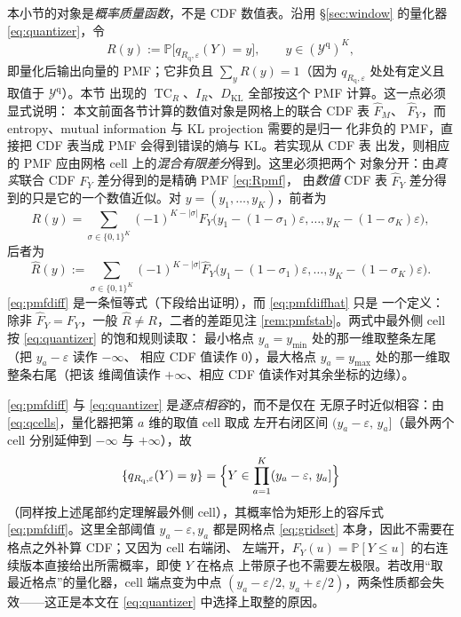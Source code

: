 \documentclass[a4paper,11pt]{article}
\theoremstyle{definition}
\newcommand{\Prob}{\mathbb P}
\newcommand{\1}{\mathbf 1}
\newcommand{\KL}{\mathrm{KL}}
\newcommand{\TC}{\operatorname{TC}}
\newcommand{\Rq}{R_{\mathrm{q}}}
\begin{document}
本小节的对象是\emph{概率质量函数}，不是 CDF 数值表。沿用 \S\ref{sec:window}
的量化器 \eqref{eq:quantizer}，令
\begin{equation}
\label{eq:Rpmf}
R(y):=\Prob\bigl[q_{\Rq,\varepsilon}(Y)=y\bigr],
\qquad
y\in(\mathcal Y^{\mathrm{q}})^{K},
\end{equation}
即量化后输出向量的 PMF；它非负且 $\sum_yR(y)=1$（因为
$q_{\Rq,\varepsilon}$ 处处有定义且取值于 $\mathcal Y^{\mathrm{q}}$）。本节
出现的 $\TC_R$、$I_R$、$D_{\KL}$ 全部按这个 PMF 计算。这一点必须显式说明：
本文前面各节计算的数值对象是网格上的联合 CDF 表 $\widehat F_M$、
$\widehat F_Y$，而 entropy、mutual information 与 KL projection 需要的是归一
化非负的 PMF，直接把 CDF 表当成 PMF 会得到错误的熵与 KL。若实现从 CDF 表
出发，则相应的 PMF 应由网格 cell 上的\emph{混合有限差分}得到。这里必须把两个
对象分开：由\emph{真实}联合 CDF $F_Y$ 差分得到的是精确 PMF \eqref{eq:Rpmf}，
由\emph{数值} CDF 表 $\widehat F_Y$ 差分得到的只是它的一个数值近似。对
$y=(y_1,\ldots,y_K)$，前者为
\begin{equation}
\label{eq:pmfdiff}
R(y)
=
\sum_{\sigma\in\{0,1\}^{K}}(-1)^{K-|\sigma|}
F_Y\bigl(y_1-(1-\sigma_1)\varepsilon,\ldots,
y_K-(1-\sigma_K)\varepsilon\bigr),
\end{equation}
后者为
\begin{equation}
\label{eq:pmfdiffhat}
\widehat R(y)
:=
\sum_{\sigma\in\{0,1\}^{K}}(-1)^{K-|\sigma|}
\widehat F_Y\bigl(y_1-(1-\sigma_1)\varepsilon,\ldots,
y_K-(1-\sigma_K)\varepsilon\bigr).
\end{equation}
\eqref{eq:pmfdiff} 是一条恒等式（下段给出证明），而 \eqref{eq:pmfdiffhat} 只是
一个定义：除非 $\widehat F_Y=F_Y$，一般 $\widehat R\ne R$，二者的差距见注
\ref{rem:pmfstab}。两式中最外侧 cell 按 \eqref{eq:quantizer} 的饱和规则读取：
最小格点
$y_a=y_{\min}$ 处的那一维取整条左尾（把 $y_a-\varepsilon$ 读作 $-\infty$、
相应 CDF 值读作 $0$），最大格点 $y_a=y_{\max}$ 处的那一维取整条右尾（把该
维阈值读作 $+\infty$、相应 CDF 值读作对其余坐标的边缘）。

\eqref{eq:pmfdiff} 与 \eqref{eq:quantizer} 是\emph{逐点相容}的，而不是仅在
无原子时近似相容：由 \eqref{eq:qcells}，量化器把第 $a$ 维的取值 cell 取成
左开右闭区间 $(y_a-\varepsilon,\,y_a]$（最外两个 cell 分别延伸到
$-\infty$ 与 $+\infty$），故
\[
\{q_{\Rq,\varepsilon}(Y)=y\}
=\Bigl\{Y\in\prod_{a=1}^{K}(y_a-\varepsilon,\,y_a]\Bigr\}
\]
（同样按上述尾部约定理解最外侧 cell），其概率恰为矩形上的容斥式
\eqref{eq:pmfdiff}。这里全部阈值 $y_a-\varepsilon,y_a$ 都是网格点
\eqref{eq:gridset} 本身，因此不需要在格点之外补算 CDF；又因为 cell 右端闭、
左端开，$F_Y(u)=\Prob[Y\le u]$ 的右连续版本直接给出所需概率，即使 $Y$ 在格点
上带原子也不需要左极限。若改用“取最近格点”的量化器，cell 端点变为中点
$(y_{a}-\varepsilon/2,\,y_a+\varepsilon/2)$，两条性质都会失效——这正是本文在
\eqref{eq:quantizer} 中选择上取整的原因。
\end{document}
